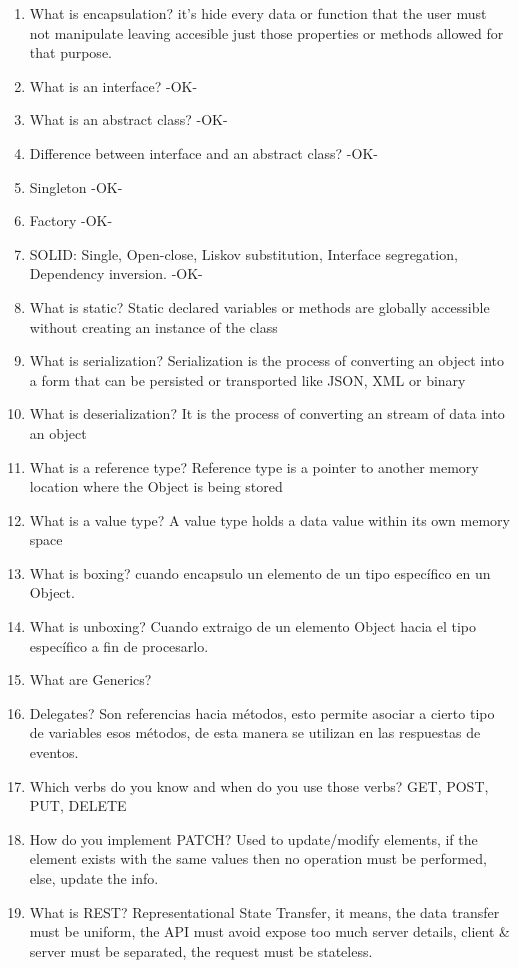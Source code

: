 \begin{multicols}{2}
\begin{enumerate}
\item What is encapsulation? it's hide every data or function that the user must not manipulate leaving accesible just those properties or methods allowed for that purpose.
\item What is an interface? -OK-
\item What is an abstract class? -OK-
\item Difference between interface and an abstract class? -OK-
\item Singleton -OK-
\item Factory -OK-
\item SOLID: Single, Open-close, Liskov substitution, Interface segregation, Dependency inversion. -OK-
\item What is static? Static declared variables or methods are globally accessible without creating an instance of the class
\item What is serialization? Serialization is the process of converting an object into a form that can be persisted or transported like JSON, XML or binary
\item What is deserialization? It is the process of converting an stream of data into an object
\item What is a reference type? Reference type is a pointer to another memory location where the Object is being stored
\item What is a value type? A value type holds a data value within its own memory space
\item What is boxing? cuando encapsulo un elemento de un tipo específico en un Object.
\item What is unboxing? Cuando extraigo de un elemento Object hacia el tipo específico a fin de procesarlo.
\item What are Generics? 
\item Delegates? Son referencias hacia métodos, esto permite asociar a cierto tipo de variables esos métodos, de esta manera se utilizan en las respuestas de eventos.
\item Which verbs do you know and when do you use those verbs? GET, POST, PUT, DELETE
\item How do you implement PATCH? Used to update/modify elements, if the element exists with the same values then no operation must be performed, else, update the info.
\item What is REST? Representational State Transfer, it means, the data transfer must be uniform, the API must avoid expose too much server details, client \& server must be separated, the request must be stateless.

\end{enumerate}
\end{multicols}
